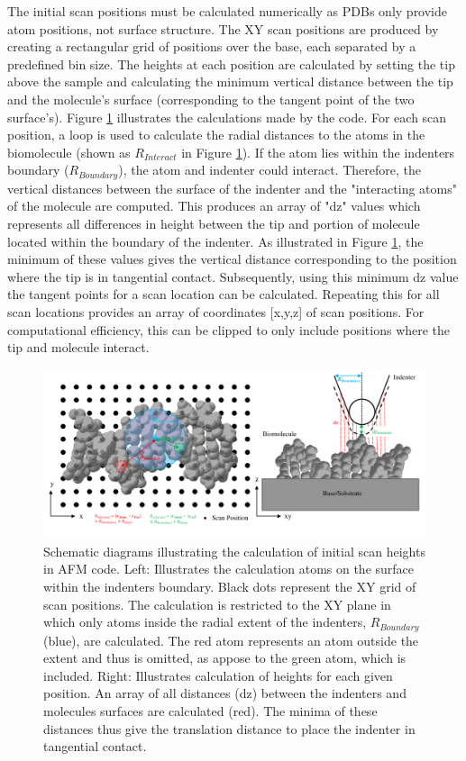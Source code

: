 The initial scan positions must be calculated numerically as PDBs only provide atom positions, not surface structure. The XY scan positions are produced by creating a rectangular grid of positions over the base, each separated by a predefined bin size. The heights at each position are calculated by setting the tip above the sample and calculating the minimum vertical distance between the tip and the molecule's surface (corresponding to the tangent point of the two surface's). Figure \ref{fig: ScanPositions} illustrates the calculations made by the code. For each scan position, a loop is used to calculate the radial distances to the atoms in the biomolecule (shown as $R_{Interact}$ in Figure \ref{fig: ScanPositions}). If the atom lies within the indenters boundary ($R_{Boundary}$), the atom and indenter could interact. Therefore, the vertical distances between the surface of the indenter and the "interacting atoms" of the molecule are computed. This produces an array of "dz" values which represents all differences in height between the tip and portion of molecule located within the boundary of the indenter. As illustrated in Figure \ref{fig: ScanPositions}, the minimum of these values gives the vertical distance corresponding to the position where the tip is in tangential contact. Subsequently, using this minimum dz value the tangent points for a scan location can be calculated. Repeating this for all scan locations provides an array of coordinates [x,y,z] of scan positions. For computational efficiency, this can be clipped to only include positions where the tip and molecule interact.

\begin{figure}[H]
\centering
    \includegraphics[width=1\linewidth]{Figures/ScanPositions diagram.pdf}
    \caption{\label{fig: ScanPositions}Schematic diagrams illustrating the calculation of initial scan heights in AFM code. Left: Illustrates the calculation atoms on the surface within the indenters boundary. Black dots represent the XY grid of scan positions. The calculation is restricted to the XY plane in which only atoms inside the radial extent of the indenters, $R_{Boundary}$ (blue), are calculated. The red atom represents an atom outside the extent and thus is omitted, as appose to the green atom, which is included. Right: Illustrates calculation of heights for each given position. An array of all distances (dz) between the indenters and molecules surfaces are calculated (red). The minima of these distances thus give the translation distance to place the indenter in tangential contact.}
\end{figure}

